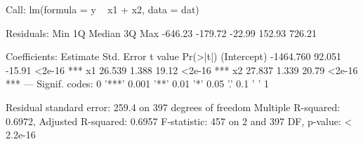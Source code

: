 \begin{Schunk}
\begin{Soutput}
Call:
lm(formula = y ~ x1 + x2, data = dat)

Residuals:
    Min      1Q  Median      3Q     Max 
-646.23 -179.72  -22.99  152.93  726.21 

Coefficients:
             Estimate Std. Error t value Pr(>|t|)    
(Intercept) -1464.760     92.051  -15.91   <2e-16 ***
x1             26.539      1.388   19.12   <2e-16 ***
x2             27.837      1.339   20.79   <2e-16 ***
---
Signif. codes:  0 '***' 0.001 '**' 0.01 '*' 0.05 '.' 0.1 ' ' 1

Residual standard error: 259.4 on 397 degrees of freedom
Multiple R-squared:  0.6972,	Adjusted R-squared:  0.6957 
F-statistic:   457 on 2 and 397 DF,  p-value: < 2.2e-16
\end{Soutput}
\end{Schunk}
